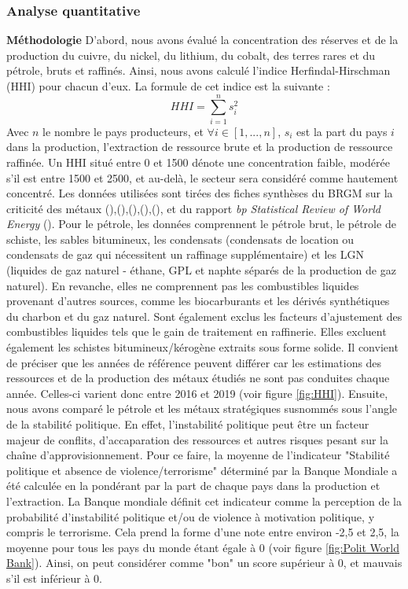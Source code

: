 \subsubsection{Analyse quantitative}
\textbf{Méthodologie}
\smallbreak
D'abord, nous avons évalué la concentration des réserves et de la production du cuivre, du nickel, du lithium, du cobalt, des terres rares et du pétrole, bruts et raffinés. Ainsi, nous avons calculé l'indice Herfindal-Hirschman (HHI) pour chacun d'eux. La formule de cet indice est la suivante :
$$
HHI = \sum_{i=1}^n s_i^2
$$
Avec $n$ le nombre le pays producteurs, et $\forall i \in [1,...,n]$, $s_i$ est la part du pays $i$ dans la production, l'extraction de ressource brute et la production de ressource raffinée. Un HHI situé entre 0 et 1500 dénote une concentration faible, modérée s'il est entre 1500 et 2500, et au-delà, le secteur sera considéré comme hautement concentré.
\smallbreak
Les données utilisées sont tirées des fiches synthèses du BRGM sur la criticité des métaux (\cite{brgm_fiche_2016}),(\cite{brgm_fiche_2016-1}),(\cite{brgm_fiche_2017}),(\cite{brgm_fiche_2018}),(\cite{brgm_fiche_2021}), et du rapport \textit{bp Statistical Review of World Energy} (\cite{bp_statistical_2022}). Pour le pétrole, les données comprennent le pétrole brut, le pétrole de schiste, les sables bitumineux, les condensats (condensats de location ou condensats de gaz qui nécessitent un raffinage supplémentaire) et les LGN (liquides de gaz naturel - éthane, GPL et naphte séparés de la production de gaz naturel).
 En revanche, elles ne comprennent pas les combustibles liquides provenant d'autres sources, comme les biocarburants et les dérivés synthétiques du charbon et du gaz naturel. Sont également exclus les facteurs d'ajustement des combustibles liquides tels que le gain de traitement en raffinerie. Elles excluent également les schistes bitumineux/kérogène extraits sous forme solide.
 Il convient de préciser que les années de référence peuvent différer car les estimations des ressources et de la production des métaux étudiés ne sont pas conduites chaque année. Celles-ci varient donc entre 2016 et 2019 (voir figure \ref{fig:HHI}).
\smallbreak
Ensuite, nous avons comparé le pétrole et les métaux stratégiques susnommés sous l'angle de la stabilité politique. En effet, l'instabilité politique peut être un facteur majeur de conflits, d'accaparation des ressources et autres risques pesant sur la chaîne d'approvisionnement. Pour ce faire, la moyenne de l'indicateur "Stabilité politique et absence de violence/terrorisme" déterminé par la Banque Mondiale a été calculée en la pondérant par la part de chaque pays dans la production et l'extraction. La Banque mondiale définit cet indicateur comme la perception de la probabilité d'instabilité politique et/ou de violence à motivation politique, y compris le terrorisme. Cela prend la forme d'une note entre environ -2,5 et 2,5, la moyenne pour tous les pays du monde étant égale à 0 (voir figure \ref{fig:Polit World Bank}). Ainsi, on peut considérer comme "bon" un score supérieur à 0, et mauvais s'il est inférieur à 0.

